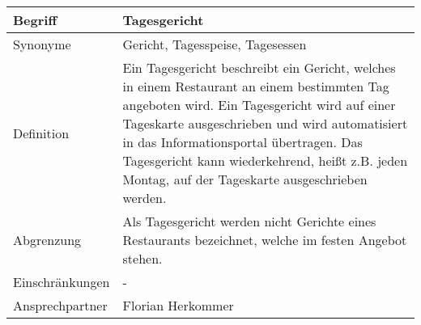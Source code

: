 \begin{table}[H]
    \centering
    \label{gls:tagesgericht}
    \begin{tabularx}{\textwidth}{| l | X |}
        \hline
        Begriff         & Tagesgericht                                                                                                                                                                                                                                                                                                                                \\
        \hline
        Synonyme        & Gericht, Tagesspeise, Tagesessen                                                                                                                                                                                                                                                                                                            \\
        \hline
        Definition      & Ein Tagesgericht beschreibt ein Gericht, welches in einem Restaurant an einem bestimmten Tag angeboten wird. Ein Tagesgericht wird auf einer Tageskarte ausgeschrieben und wird automatisiert in das Informationsportal übertragen. Das Tagesgericht kann wiederkehrend, heißt z.B. jeden Montag, auf der Tageskarte ausgeschrieben werden. \\
        \hline
        Abgrenzung      & Als Tagesgericht werden nicht Gerichte eines Restaurants bezeichnet, welche im festen Angebot stehen.                                                                                                                                                                                                                                       \\
        \hline
        Einschränkungen & -                                                                                                                                                                                                                                                                                                                                           \\
        \hline
        Ansprechpartner & Florian Herkommer                                                                                                                                                                                                                                                                                                                           \\

\end{tabularx}
\end{table}
